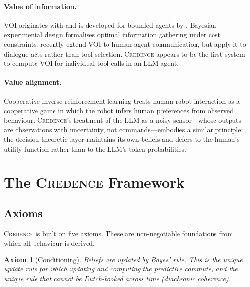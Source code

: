 \documentclass[11pt]{article}
\newcommand{\credence}{\textsc{Credence}}
\newtheorem{axiom}{Axiom}
\begin{document}
\paragraph{Value of information.} VOI originates with \citet{howard1966information} and is developed for bounded agents by \citet{russell1991principles}. Bayesian experimental design \citep{chaloner1995bayesian} formalises optimal information gathering under cost constraints. \citet{dong2026voi} recently extend VOI to human-agent communication, but apply it to dialogue acts rather than tool selection. \credence{} appears to be the first system to compute VOI for individual tool calls in an LLM agent.

\paragraph{Value alignment.} Cooperative inverse reinforcement learning \citep{hadfield2016cooperative} treats human-robot interaction as a cooperative game in which the robot infers human preferences from observed behaviour. \credence{}'s treatment of the LLM as a noisy sensor---whose outputs are observations with uncertainty, not commands---embodies a similar principle: the decision-theoretic layer maintains its own beliefs and defers to the human's utility function rather than to the LLM's token probabilities.


\section{The \credence{} Framework}
\label{sec:framework}

\subsection{Axioms}
\label{sec:axioms}

\credence{} is built on five axioms. These are non-negotiable foundations from which all behaviour is derived.

\begin{axiom}[Conditioning]
Beliefs are updated by Bayes' rule. This is the unique update rule for which updating and computing the predictive commute, and the unique rule that cannot be Dutch-booked across time (diachronic coherence).
\end{axiom}
\end{document}
